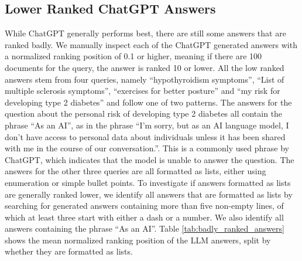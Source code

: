 \subsection{Lower Ranked ChatGPT Answers}
While ChatGPT generally performs best, there are still some answers that are ranked badly.
We manually inspect each of the ChatGPT generated answers with a normalized ranking position of 0.1 or higher, meaning if there are 100 documents for the query, the answer is ranked 10 or lower.
All the low ranked answers stem from four queries, namely ``hypothyroidism symptoms'', ``List of multiple sclerosis symptoms'',  ``exercises for better posture'' and ``my risk for developing type 2 diabetes'' and follow one of two patterns.
The answers for the question about the personal risk of developing type 2 diabetes all contain the phrase ``As an AI'', as in the phrase ``I'm sorry, but as an AI language model, I don't have access to personal data about individuals unless it has been shared with me in the course of our conversation.''.
This is a commonly used phrase by ChatGPT, which indicates that the model is unable to answer the question.
The answers for the other three queries are all formatted as lists, either using enumeration or simple bullet points.
To investigate if answers formatted as lists are generally ranked lower, we identify all answers that are formatted as lists by searching for generated answers containing more than five non-empty lines, of which at least three start with either a dash or a number.
We also identify all answers containing the phrase ``As an AI''.
Table \ref{tab:badly_ranked_answers} shows the mean normalized ranking position of the LLM answers, split by whether they are formatted as lists.
